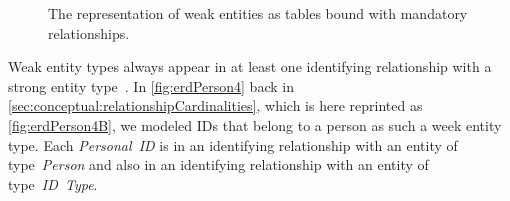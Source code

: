 %
%
\begin{figure}%
\centering%
%
%
%
\floatRowSep%
%
%
%
\caption{The representation of weak entities as tables bound with mandatory relationships.}%
\label{fig:logicalErdPerson4X}%
\end{figure}%
%
Weak entity types always appear in at least one identifying relationship with a strong entity type~\cite{S2024D:MEDTRDM}.
In \cref{fig:erdPerson4} back in \cref{sec:conceptual:relationshipCardinalities}, which is here reprinted as \cref{fig:erdPerson4B}, we modeled IDs that belong to a person as such a week entity type.
Each \emph{Personal~ID} is in an identifying relationship with an entity of type~\emph{Person} and also in an identifying relationship with an entity of type~\emph{ID~Type}.

